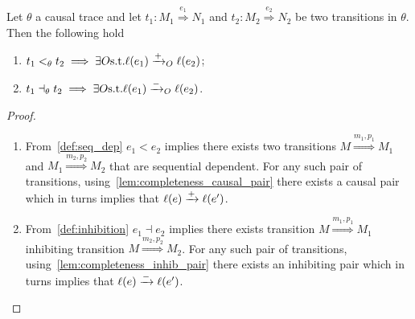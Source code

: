 \begin{lemma}
  \label{lemma:pos_infl}
  Let $\theta$ a causal trace and let $t_1:M_1\overset{e_1}{\Rightarrow}N_1$ and $t_2:M_2\overset{e_2}{\Rightarrow}N_2$ be two transitions in $\theta$. Then the following hold
  \begin{enumerate}
  \item $t_1 <_{\theta} t_2\implies \exists O \text{s.t.}\ell(e_1)\xrightarrow{+}_O\ell(e_2)$;
  \item $t_1\dashv_{\theta} t_2 \implies\exists O \text{s.t.}\ell(e_1)\xrightarrow{-}_O\ell(e_2)$.
  \end{enumerate}
\end{lemma}
\begin{proof}
  \begin{enumerate}
  \item From~\autoref{def:seq_dep} $e_1 < e_2$ implies there exists two transitions $M\overset{m_1,p_1}{\Rightarrow} M_1$ and $M_1\overset{m_2,p_2}{\Rightarrow} M_2$ that are sequential dependent. For any such pair of transitions, using~\autoref{lem:completeness_causal_pair} there exists a causal pair which in turns implies that $\ell(e)\xrightarrow{+}\ell(e')$.

  \item From~\autoref{def:inhibition} $e_1 \dashv e_2$ implies there exists transition $M\overset{m_1,p_1}{\Rightarrow} M_1$ inhibiting transition $M\overset{m_2,p_2}{\Rightarrow} M_2$. For any such pair of transitions, using~\autoref{lem:completeness_inhib_pair} there exists an inhibiting pair which in turns implies that $\ell(e)\xrightarrow{-}\ell(e')$.
  \end{enumerate}
\end{proof}

